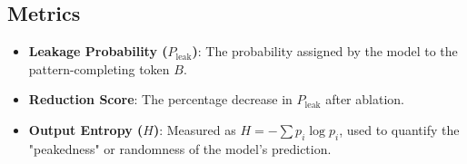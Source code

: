 \subsection{Metrics}
\begin{itemize}[leftmargin=*]
    \item \textbf{Leakage Probability ($P_{\text{leak}}$)}: The probability assigned by the model to the pattern-completing token $B$.
    \item \textbf{Reduction Score}: The percentage decrease in $P_{\text{leak}}$ after ablation.
    \item \textbf{Output Entropy ($H$)}: Measured as $H = -\sum p_i \log p_i$, used to quantify the "peakedness" or randomness of the model's prediction.
\end{itemize}
